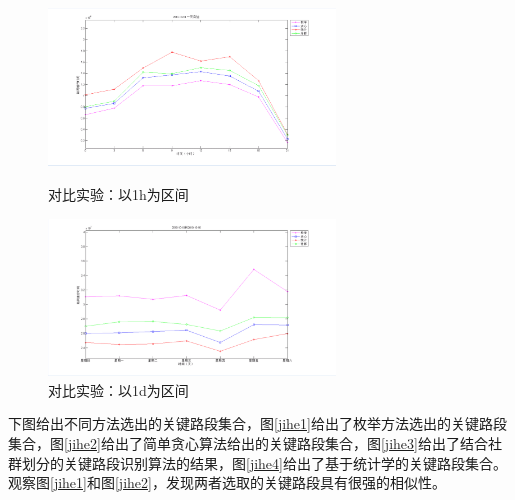 				\begin{figure}
				\begin{minipage}{0.5\linewidth}
					\centering
					\includegraphics[width=3in]{picture/fenqunend}
					\caption{对比实验：以1h为区间}
					\label{fenqunend}
				\end{minipage}%
				\begin{minipage}{0.5\linewidth}
					\centering
					\includegraphics[width=3in]{picture/end}
					\caption{对比实验：以1d为区间}
					\label{end}
				\end{minipage}
				\end{figure}

		下图给出不同方法选出的关键路段集合，图\ref{jihe1}给出了枚举方法选出的关键路段集合，图\ref{jihe2}给出了简单贪心算法给出的关键路段集合，图\ref{jihe3}给出了结合社群划分的关键路段识别算法的结果，图\ref{jihe4}给出了基于统计学的关键路段集合。观察图\ref{jihe1}和图\ref{jihe2}，发现两者选取的关键路段具有很强的相似性。

